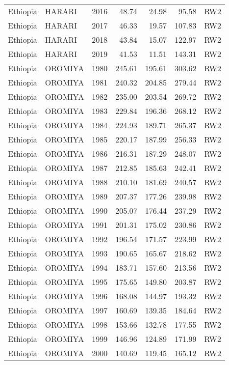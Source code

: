\begin{longtable}{lllrrrl}
  Ethiopia & HARARI & 2016 & 48.74 & 24.98 & 95.58 & RW2 \\ 
  Ethiopia & HARARI & 2017 & 46.33 & 19.57 & 107.83 & RW2 \\ 
  Ethiopia & HARARI & 2018 & 43.84 & 15.07 & 122.97 & RW2 \\ 
  Ethiopia & HARARI & 2019 & 41.53 & 11.51 & 143.31 & RW2 \\ 
  Ethiopia & OROMIYA & 1980 & 245.61 & 195.61 & 303.62 & RW2 \\ 
  Ethiopia & OROMIYA & 1981 & 240.32 & 204.85 & 279.44 & RW2 \\ 
  Ethiopia & OROMIYA & 1982 & 235.00 & 203.54 & 269.72 & RW2 \\ 
  Ethiopia & OROMIYA & 1983 & 229.84 & 196.36 & 268.12 & RW2 \\ 
  Ethiopia & OROMIYA & 1984 & 224.93 & 189.71 & 265.37 & RW2 \\ 
  Ethiopia & OROMIYA & 1985 & 220.17 & 187.99 & 256.33 & RW2 \\ 
  Ethiopia & OROMIYA & 1986 & 216.31 & 187.29 & 248.07 & RW2 \\ 
  Ethiopia & OROMIYA & 1987 & 212.85 & 185.63 & 242.41 & RW2 \\ 
  Ethiopia & OROMIYA & 1988 & 210.10 & 181.69 & 240.57 & RW2 \\ 
  Ethiopia & OROMIYA & 1989 & 207.37 & 177.26 & 239.98 & RW2 \\ 
  Ethiopia & OROMIYA & 1990 & 205.07 & 176.44 & 237.29 & RW2 \\ 
  Ethiopia & OROMIYA & 1991 & 201.31 & 175.02 & 230.86 & RW2 \\ 
  Ethiopia & OROMIYA & 1992 & 196.54 & 171.57 & 223.99 & RW2 \\ 
  Ethiopia & OROMIYA & 1993 & 190.65 & 165.67 & 218.62 & RW2 \\ 
  Ethiopia & OROMIYA & 1994 & 183.71 & 157.60 & 213.56 & RW2 \\ 
  Ethiopia & OROMIYA & 1995 & 175.65 & 149.80 & 203.87 & RW2 \\ 
  Ethiopia & OROMIYA & 1996 & 168.08 & 144.97 & 193.32 & RW2 \\ 
  Ethiopia & OROMIYA & 1997 & 160.69 & 139.35 & 184.64 & RW2 \\ 
  Ethiopia & OROMIYA & 1998 & 153.66 & 132.78 & 177.55 & RW2 \\ 
  Ethiopia & OROMIYA & 1999 & 146.96 & 124.89 & 171.99 & RW2 \\ 
  Ethiopia & OROMIYA & 2000 & 140.69 & 119.45 & 165.12 & RW2 \\ 

\end{longtable}

